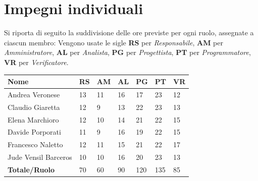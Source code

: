 \documentclass[12pt]{article}
\begin{document}
\section{Impegni individuali}
Si riporta di seguito la suddivisione delle ore previste per ogni ruolo, assegnate a ciascun membro:
\smallskip
\noindent Vengono usate le sigle \textbf{RS} per \textit{Responsabile}, \textbf{AM} per \textit{Amministratore}, \textbf{AL} per \textit{Analista}, \textbf{PG} per \textit{Progettista}, \textbf{PT} per \textit{Programmatore}, \textbf{VR} per \textit{Verificatore}.

\begin{center}
    \begin{tabular}{|l|l|l|l|l|l|l|}
        \hline
        \textbf{Nome} & \textbf{RS} & \textbf{AM} & \textbf{AL} & \textbf{PG} & \textbf{PT} & \textbf{VR}\\
        \hline
        Andrea Veronese & 13 & 11 & 16 & 17 & 23 & 12  \\
        \hline
        Claudio Giaretta & 12 & 9 & 13 & 22 & 23 & 13\\
        \hline
        Elena Marchioro & 12 & 10 & 14 & 21 & 22 & 15 \\
        \hline
        Davide Porporati & 11 & 9 & 16 & 19 & 22 & 15 \\
        \hline
        Francesco Naletto & 12 & 11 & 15 & 21 & 22 & 17 \\
        \hline
        Jude Vensil Barceros & 10 & 10 & 16 & 20 & 23 & 13 \\
        \hline
        \textbf{Totale/Ruolo} & 70 & 60 & 90 & 120 & 135 & 85 \\
        \hline
    \end{tabular}
\end{center}
\end{document}
